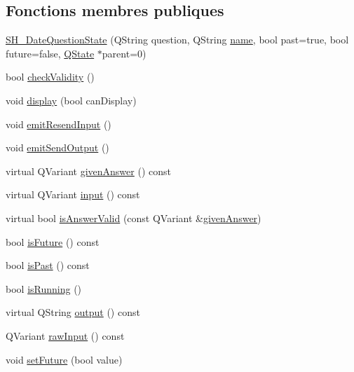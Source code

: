 \subsection*{Fonctions membres publiques}
\begin{DoxyCompactItemize}
\item 
\hyperlink{classSH__DateQuestionState_a9a60060ebcd5994d62f0ca5f0e6b5e98}{S\-H\-\_\-\-Date\-Question\-State} (Q\-String question, Q\-String \hyperlink{classSH__NamedObject_a9f686c6f2a5bcc08ad03d0cee0151f0f}{name}, bool past=true, bool future=false, \hyperlink{classQState}{Q\-State} $\ast$parent=0)
\item 
bool \hyperlink{classSH__QuestionState_a902be003650c33d954d707b2d3ee0bb9}{check\-Validity} ()
\item 
void \hyperlink{classSH__InOutState_a616f88b20478b81b2927a9ddc2b4f521}{display} (bool can\-Display)
\item 
void \hyperlink{classSH__InOutState_ad1695493d39c5194e5b7c6372754ddd7}{emit\-Resend\-Input} ()
\item 
void \hyperlink{classSH__InOutState_a40995f4a8201f21d26b7e78b7e7b652e}{emit\-Send\-Output} ()
\item 
virtual Q\-Variant \hyperlink{classSH__QuestionState_a29cdea8bc55e39e3ed02d24743c30f8c}{given\-Answer} () const 
\item 
virtual Q\-Variant \hyperlink{classSH__InOutState_a8e1b78069343122df7713624a1a5a100}{input} () const 
\item 
virtual bool \hyperlink{classSH__DateQuestionState_a303e9f86c37ded79fb3ad4d31d183c21}{is\-Answer\-Valid} (const Q\-Variant \&\hyperlink{classSH__QuestionState_a29cdea8bc55e39e3ed02d24743c30f8c}{given\-Answer})
\item 
bool \hyperlink{classSH__DateQuestionState_a737a3f24e3bffbd367d439dd47fcc3cd}{is\-Future} () const 
\item 
bool \hyperlink{classSH__DateQuestionState_ad16ab3d70e9356ca17c0a05d9a2093da}{is\-Past} () const 
\item 
bool \hyperlink{classSH__GenericState_a5f731810dad0cacd28828ccbf1539e4e}{is\-Running} ()
\item 
virtual Q\-String \hyperlink{classSH__InOutState_a17ed7eaf5e3ed5af80a4f9fe65d5bfd9}{output} () const 
\item 
Q\-Variant \hyperlink{classSH__DateQuestionState_a71917e94cb9ce692f916a848bc8c8892}{raw\-Input} () const 
\item 
void \hyperlink{classSH__DateQuestionState_acda6fa1cdc24ad7c5c012d88c948b819}{set\-Future} (bool value)

\end{DoxyCompactItemize}

